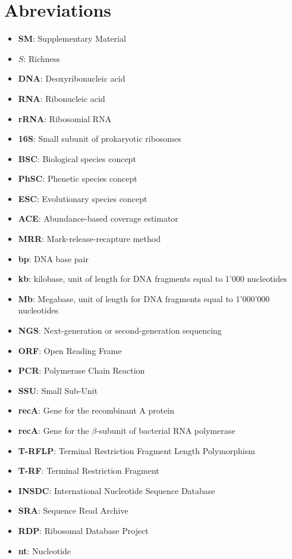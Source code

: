 \logvartrue
\chapter{Abreviations}

\begin{itemize}
\item \textbf{SM}: Supplementary Material
\item \textbf{$S$}: Richness
\item \textbf{DNA}: Deoxyribonucleic acid
\item \textbf{RNA}: Ribonucleic acid
\item \textbf{rRNA}: Ribosomial RNA
\item \textbf{16S}: Small subunit of prokaryotic ribosomes
\item \textbf{BSC}: Biological species concept
\item \textbf{PhSC}: Phenetic species concept
\item \textbf{ESC}: Evolutionary species concept
\item \textbf{ACE}: Abundance-based coverage estimator
\item \textbf{MRR}: Mark-release-recapture method
\item \textbf{bp}: DNA base pair
\item \textbf{kb}: kilobase, unit of length for DNA fragments equal to 1'000 nucleotides
\item \textbf{Mb}: Megabase, unit of length for DNA fragments equal to 1'000'000 nucleotides
\item \textbf{NGS}: Next-generation or second-generation sequencing
\item \textbf{ORF}: Open Reading Frame
\item \textbf{PCR}: Polymerase Chain Reaction
\item \textbf{SSU}: Small Sub-Unit
\item \textbf{recA}: Gene for the recombinant A protein
\item \textbf{recA}: Gene for the $\beta$-subunit of bacterial RNA polymerase
\item \textbf{T-RFLP}: Terminal Restriction Fragment Length Polymorphism
\item \textbf{T-RF}: Terminal Restriction Fragment
\item \textbf{INSDC}: International Nucleotide Sequence Database
\item \textbf{SRA}: Sequence Read Archive
\item \textbf{RDP}: Ribosomal Database Project
\item \textbf{nt}: Nucleotide

\end{itemize}
